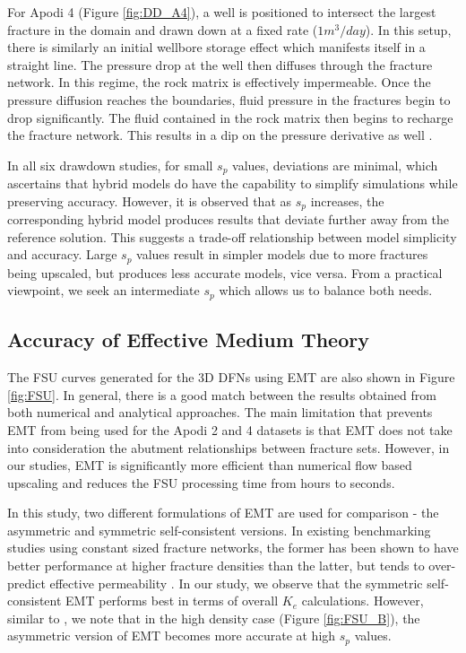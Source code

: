 \documentclass[a4paper]{article}
\begin{document}
For Apodi 4 (Figure \ref{fig:DD_A4}), a well is positioned to intersect the largest fracture in the domain and drawn down at a fixed rate ($1m^3/day$). In this setup, there is similarly an initial wellbore storage effect which manifests itself in a straight line. The pressure drop at the well then diffuses through the fracture network. In this regime, the rock matrix is effectively impermeable. Once the pressure diffusion reaches the boundaries, fluid pressure in the fractures begin to drop significantly. The fluid contained in the rock matrix then begins to recharge the fracture network. This results in a dip on the pressure derivative as well \citep{Gringarten1987}.

In all six drawdown studies, for small $s_p$ values, deviations are minimal, which ascertains that hybrid models do have the capability to simplify simulations while preserving accuracy. However, it is observed that as $s_p$ increases, the corresponding hybrid model produces results that deviate further away from the reference solution. This suggests a trade-off relationship between model simplicity and accuracy. Large $s_p$ values result in simpler models due to more fractures being upscaled, but produces less accurate models, vice versa. From a practical viewpoint, we seek an intermediate $s_p$ which allows us to balance both needs. 



\subsection{Accuracy of Effective Medium Theory}
The FSU curves generated for the 3D DFNs using EMT are also shown in Figure \ref{fig:FSU}. In general, there is a good match between the results obtained from both numerical and analytical approaches. The main limitation that prevents EMT from being used for the Apodi 2 and 4 datasets is that EMT does not take into consideration the abutment relationships between fracture sets. However, in our studies, EMT is significantly more efficient than numerical flow based upscaling and reduces the FSU processing time from hours to seconds.

In this study, two different formulations of EMT are used for comparison - the asymmetric and symmetric self-consistent versions. In existing benchmarking studies using constant sized fracture networks, the former has been shown to have better performance at higher fracture densities than the latter, but tends to over-predict effective permeability \citep{Saevik2013, Saevik2014}. In our study, we observe that the symmetric self-consistent EMT performs best in terms of overall $K_e$ calculations. However, similar to \citet{Saevik2013}, we note that in the high density case (Figure \ref{fig:FSU_B}), the asymmetric version of EMT becomes more accurate at high $s_p$ values.
\end{document}
